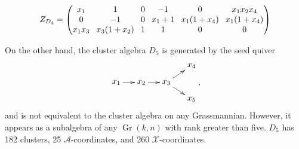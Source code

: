 \documentclass[11pt]{article}
\DeclareMathOperator{\Gr}{Gr}
\def\xcoords{$\mathcal{X}$-coordinates}
\def\acoords{$\mathcal{A}$-coordinates}
\begin{document}
\begin{equation}
Z_{D_4} = 
\begingroup
\setlength\arraycolsep{4pt}
\begin{pmatrix} 
 x_1 & 1 & 0 & -1 & 0 & x_1 x_2 x_4 \\
 0 & -1 & 0 & x_1+1 & x_1 (1+x_4) & x_1 (1+x_4) \\
 x_1 x_3 & x_3 (1+x_2)  & 1 & 1 & 0 & 0
 \end{pmatrix}
\endgroup
\end{equation}


On the other hand, the cluster algebra $D_5$ is generated by the seed quiver
\begin{equation}\label{def:D5}
    \begin{gathered}
    \begin{xy} 0;<1pt,0pt>:<0pt,-1pt>::
      (0,20) *+{x_1} ="1",
      (30,20) *+{x_2} ="2",
      (60,20) *+{x_3} ="3",
      (90,0) *+{x_4} ="4",
      (90,40) *+{x_5} ="5",
      "1", {\ar"2"},
      "2", {\ar"3"},
      "3", {\ar"4"},
      "3", {\ar"5"},
    \end{xy}
    \end{gathered} ,
\end{equation}
and is not equivalent to the cluster algebra on any Grassmannian. However, it appears as a subalgebra of any $\Gr(k,n)$ with rank greater than five. $D_5$ has 182 clusters, 25 \acoords, and 260 \xcoords. 
\end{document}
